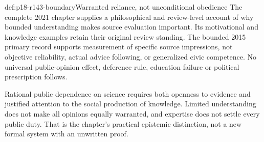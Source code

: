 \begin{proofboundary}{def:p18-r143-boundary}{Warranted reliance, not unconditional obedience}
The complete 2021 chapter supplies a philosophical and review-level
account of why bounded understanding makes source evaluation important.
Its motivational and knowledge examples retain their original review
standing. The bounded 2015 primary record supports measurement of specific
source impressions, not objective reliability, actual advice following,
or generalized civic competence. No universal public-opinion effect,
deference rule, education failure or political prescription follows.

Rational public dependence on science requires both openness to evidence
and justified attention to the social production of knowledge. Limited
understanding does not make all opinions equally warranted, and expertise
does not settle every public duty. That is the chapter's practical
epistemic distinction, not a new formal system with an unwritten proof.
\end{proofboundary}
